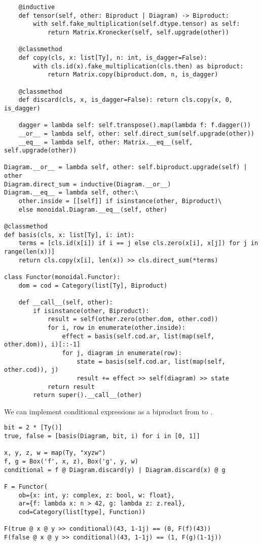 \begin{python}
\begin{verbatim}
    @inductive
    def tensor(self, other: Biproduct | Diagram) -> Biproduct:
        with self.fake_multiplication(self.dtype.tensor) as self:
            return Matrix.Kronecker(self, self.upgrade(other))

    @classmethod
    def copy(cls, x: list[Ty], n: int, is_dagger=False):
        with cls.id(x).fake_multiplication(cls.then) as biproduct:
            return Matrix.copy(biproduct.dom, n, is_dagger)

    @classmethod
    def discard(cls, x, is_dagger=False): return cls.copy(x, 0, is_dagger)

    dagger = lambda self: self.transpose().map(lambda f: f.dagger())
    __or__ = lambda self, other: self.direct_sum(self.upgrade(other))
    __eq__ = lambda self, other: Matrix.__eq__(self, self.upgrade(other))

Diagram.__or__ = lambda self, other: self.biproduct.upgrade(self) | other
Diagram.direct_sum = inductive(Diagram.__or__)
Diagram.__eq__ = lambda self, other:\
    other.inside = [[self]] if isinstance(other, Biproduct)\
    else monoidal.Diagram.__eq__(self, other)

@classmethod
def basis(cls, x: list[Ty], i: int):
    terms = [cls.id(x[i]) if i == j else cls.zero(x[i], x[j]) for j in range(len(x))]
    return cls.copy(x[i], len(x)) >> cls.direct_sum(*terms)

class Functor(monoidal.Functor):
    dom = cod = Category(list[Ty], Biproduct)

    def __call__(self, other):
        if isinstance(other, Biproduct):
            result = self(other.zero(other.dom, other.cod))
            for i, row in enumerate(other.inside):
                effect = basis(self.cod.ar, list(map(self, other.dom)), i)[::-1]
                for j, diagram in enumerate(row):
                    state = basis(self.cod.ar, list(map(self, other.cod)), j)
                    result += effect >> self(diagram) >> state
            return result
        return super().__call__(other)
\end{verbatim}
\end{python}

\begin{example}
We can implement conditional expressions   as a biproduct
from  to \py{[z, w]}.

\begin{verbatim}
bit = 2 * [Ty()]
true, false = [basis(Diagram, bit, i) for i in [0, 1]]

x, y, z, w = map(Ty, "xyzw")
f, g = Box('f', x, z), Box('g', y, w)
conditional = f @ Diagram.discard(y) | Diagram.discard(x) @ g

F = Functor(
    ob={x: int, y: complex, z: bool, w: float},
    ar={f: lambda x: n > 42, g: lambda z: z.real},
    cod=Category(list[type], Function))

F(true @ x @ y >> conditional)(43, 1-1j) == (0, F(f)(43))
F(false @ x @ y >> conditional)(43, 1-1j) == (1, F(g)(1-1j))
\end{verbatim}
\end{example}

